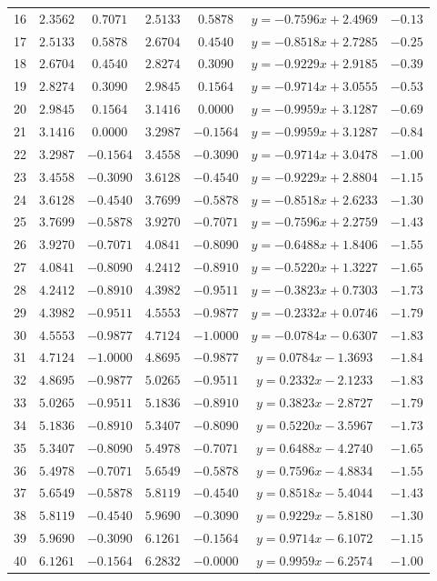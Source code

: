 \documentclass[12pt,a4paper]{report}
\begin{document}
\begin{table}
\begin{center}
\begin{tabular}{c | c c | c c | c | c}
			16 &$2.3562$&$0.7071$&$2.5133$&$0.5878$&$y = -0.7596x+2.4969$&$-0.13$\\
			17 &$2.5133$&$0.5878$&$2.6704$&$0.4540$&$y = -0.8518x+2.7285$&$-0.25$\\
			18 &$2.6704$&$0.4540$&$2.8274$&$0.3090$&$y = -0.9229x+2.9185$&$-0.39$\\
			19 &$2.8274$&$0.3090$&$2.9845$&$0.1564$&$y = -0.9714x+3.0555$&$-0.53$\\
			20 &$2.9845$&$0.1564$&$3.1416$&$0.0000$&$y = -0.9959x+3.1287$&$-0.69$\\
			21 &$3.1416$&$0.0000$&$3.2987$&$-0.1564$&$y = -0.9959x+3.1287$&$-0.84$\\
			22 &$3.2987$&$-0.1564$&$3.4558$&$-0.3090$&$y = -0.9714x+3.0478$&$-1.00$\\
			23 &$3.4558$&$-0.3090$&$3.6128$&$-0.4540$&$y = -0.9229x+2.8804$&$-1.15$\\
			24 &$3.6128$&$-0.4540$&$3.7699$&$-0.5878$&$y = -0.8518x+2.6233$&$-1.30$\\
			25 &$3.7699$&$-0.5878$&$3.9270$&$-0.7071$&$y = -0.7596x+2.2759$&$-1.43$\\
			26 &$3.9270$&$-0.7071$&$4.0841$&$-0.8090$&$y = -0.6488x+1.8406$&$-1.55$\\
			27 &$4.0841$&$-0.8090$&$4.2412$&$-0.8910$&$y = -0.5220x+1.3227$&$-1.65$\\
			28 &$4.2412$&$-0.8910$&$4.3982$&$-0.9511$&$y = -0.3823x+0.7303$&$-1.73$\\
			29 &$4.3982$&$-0.9511$&$4.5553$&$-0.9877$&$y = -0.2332x+0.0746$&$-1.79$\\
			30 &$4.5553$&$-0.9877$&$4.7124$&$-1.0000$&$y = -0.0784x-0.6307$&$-1.83$\\
			31 &$4.7124$&$-1.0000$&$4.8695$&$-0.9877$&$y =  0.0784x-1.3693$&$-1.84$\\
			32 &$4.8695$&$-0.9877$&$5.0265$&$-0.9511$&$y =  0.2332x-2.1233$&$-1.83$\\
			33 &$5.0265$&$-0.9511$&$5.1836$&$-0.8910$&$y =  0.3823x-2.8727$&$-1.79$\\
			34 &$5.1836$&$-0.8910$&$5.3407$&$-0.8090$&$y =  0.5220x-3.5967$&$-1.73$\\
			35 &$5.3407$&$-0.8090$&$5.4978$&$-0.7071$&$y =  0.6488x-4.2740$&$-1.65$\\
			36 &$5.4978$&$-0.7071$&$5.6549$&$-0.5878$&$y =  0.7596x-4.8834$&$-1.55$\\
			37 &$5.6549$&$-0.5878$&$5.8119$&$-0.4540$&$y =  0.8518x-5.4044$&$-1.43$\\
			38 &$5.8119$&$-0.4540$&$5.9690$&$-0.3090$&$y =  0.9229x-5.8180$&$-1.30$\\
			39 &$5.9690$&$-0.3090$&$6.1261$&$-0.1564$&$y =  0.9714x-6.1072$&$-1.15$\\
			40 &$6.1261$&$-0.1564$&$6.2832$&$-0.0000$&$y =  0.9959x-6.2574$&$-1.00$\\
			

\end{tabular}
\end{center}
\end{table}
\end{document}
